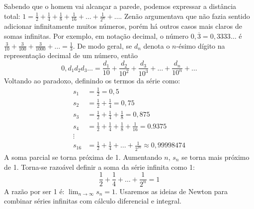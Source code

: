 Sabendo que o homem vai alcançar a parede, podemos expressar a distância total: $1=\frac{1}{2}+\frac{1}{4}+\frac{1}{8}+\frac{1}{16}+\dots+\frac{1}{2^n}+\dots$. Zenão argumentava que não fazia sentido adicionar infinitamente muitos números, porém há outros casos mais claros de somas infinitas. Por exemplo, em notação decimal, o número $0,\overline{3} = 0,3333\dots$ é $\frac{3}{10}+\frac{3}{100}+\frac{3}{1000}+\dots=\frac{1}{3}$. De modo geral, se $d_n$ denota o $n$-ésimo dígito na representação decimal de um número, então $$0,d_1d_2d_3\dots = \frac{d_1}{10}+\frac{d_2}{10^2}+\frac{d_3}{10^3}+\dots+\frac{d_n}{10^n}+\dots$$
Voltando ao paradoxo, definindo os termos da série como:$$\begin{aligned}
s_1 &= \frac{1}{2}= 0,5\\
s_2 &= \frac{1}{2}+\frac{1}{4} = 0,75\\
s_3 &= \frac{1}{2}+\frac{1}{4}+\frac{1}{8} = 0,875\\
s_4 &= \frac{1}{2}+\frac{1}{4}+\frac{1}{8}+\frac{1}{16}=0.9375\\
\vdots\\
s_{16} &= \frac{1}{2}+\frac{1}{4}+\dots+\frac{1}{2^{16}}\approx 0,99998474
\end{aligned}$$
A soma parcial se torna próxima de 1. Aumentando $n$, $s_n$ se torna mais próximo de 1. Torna-se razoável definir a soma da série infinita como 1: $$\frac{1}{2}+\frac{1}{4}+\dots+\frac{1}{2^n} = 1$$ A razão por ser 1 é: $\lim_{n\rightarrow\infty}s_n=1$. Usaremos as ideias de Newton para combinar séries infinitas com cálculo diferencial e integral. 
